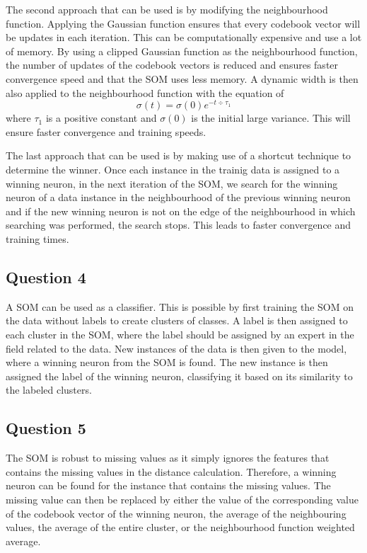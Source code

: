 \documentclass[10pt]{article}
\begin{document}
The second approach that can be used is by modifying the neighbourhood function. Applying the
Gaussian function ensures that every codebook vector will be updates in each iteration.
This can be computationally expensive and use a lot of memory. By using a clipped Gaussian function
as the neighbourhood function, the number of updates of the codebook vectors is reduced and ensures
faster convergence speed and that the SOM uses less memory. A dynamic width is then also applied to
the neighbourhood function with the equation of
\begin{equation*}
    \sigma (t) = \sigma(0)e^{-t \div \tau_1}
\end{equation*}
where $\tau_1$ is a positive constant and $\sigma(0)$ is the initial large variance.
This will ensure faster convergence and training speeds.

The last approach that can be used is by making use of a shortcut technique to determine the winner.
Once each instance in the trainig data is assigned to a winning neuron, in the next iteration
of the SOM, we search for the winning neuron of a data instance in the neighbourhood of the
previous winning neuron and if the new winning neuron is not on the edge of the neighbourhood in
which searching was performed, the search stops. This leads to faster convergence and training times.

\subsection*{Question 4}

A SOM can be used as a classifier. This is possible by first training the SOM on the data without
labels to create clusters of classes. A label is then assigned to each cluster in the SOM, where the label
should be assigned by an expert in the field related to the data. New instances of the data is then given
to the model, where a winning neuron from the SOM is found. The new instance is then assigned the label
of the winning neuron, classifying it based on its similarity to the labeled clusters.

\subsection*{Question 5}

The SOM is robust to missing values as it simply ignores the features that contains the missing values
in the distance calculation. Therefore, a winning neuron can be found for the instance that contains
the missing values. The missing value can then be replaced by either the value of the corresponding
value of the codebook vector of the winning neuron, the average of the neighbouring values, the average
of the entire cluster, or the neighbourhood function weighted average.
\end{document}
